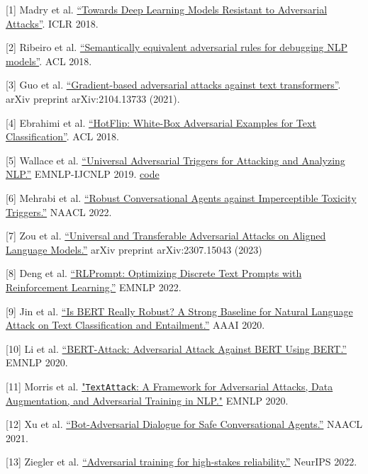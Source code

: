 {[}1{]} Madry et al. \href{https://arxiv.org/abs/1706.06083}{``Towards Deep Learning Models Resistant to Adversarial Attacks''}. ICLR 2018.

{[}2{]} Ribeiro et al. \href{https://www.aclweb.org/anthology/P18-1079/}{``Semantically equivalent adversarial rules for debugging NLP models''}. ACL 2018.

{[}3{]} Guo et al. \href{https://arxiv.org/abs/2104.13733}{``Gradient-based adversarial attacks against text transformers''}. arXiv preprint arXiv:2104.13733 (2021).

{[}4{]} Ebrahimi et al. \href{https://arxiv.org/abs/1712.06751}{``HotFlip: White-Box Adversarial Examples for Text Classification''}. ACL 2018.

{[}5{]} Wallace et al. \href{https://arxiv.org/abs/1908.07125}{``Universal Adversarial Triggers for Attacking and Analyzing NLP.''} EMNLP-IJCNLP 2019. \textbar{} \href{https://github.com/Eric-Wallace/universal-triggers}{code}

{[}6{]} Mehrabi et al. \href{https://arxiv.org/abs/2205.02392}{``Robust Conversational Agents against Imperceptible Toxicity Triggers.''} NAACL 2022.

{[}7{]} Zou et al. \href{https://arxiv.org/abs/2307.15043}{``Universal and Transferable Adversarial Attacks on Aligned Language Models.''} arXiv preprint arXiv:2307.15043 (2023)

{[}8{]} Deng et al. \href{https://arxiv.org/abs/2205.12548}{``RLPrompt: Optimizing Discrete Text Prompts with Reinforcement Learning.''} EMNLP 2022.

{[}9{]} Jin et al. \href{https://arxiv.org/abs/1907.11932}{``Is BERT Really Robust? A Strong Baseline for Natural Language Attack on Text Classification and Entailment.''} AAAI 2020.

{[}10{]} Li et al. \href{https://aclanthology.org/2020.emnlp-main.500}{``BERT-Attack: Adversarial Attack Against BERT Using BERT.''} EMNLP 2020.

{[}11{]} Morris et al. \href{https://arxiv.org/abs/2005.05909}{"\texttt{TextAttack}: A Framework for Adversarial Attacks, Data Augmentation, and Adversarial Training in NLP."} EMNLP 2020.

{[}12{]} Xu et al. \href{https://aclanthology.org/2021.naacl-main.235/}{``Bot-Adversarial Dialogue for Safe Conversational Agents.''} NAACL 2021.

{[}13{]} Ziegler et al. \href{https://arxiv.org/abs/2205.01663}{``Adversarial training for high-stakes reliability.''} NeurIPS 2022.

